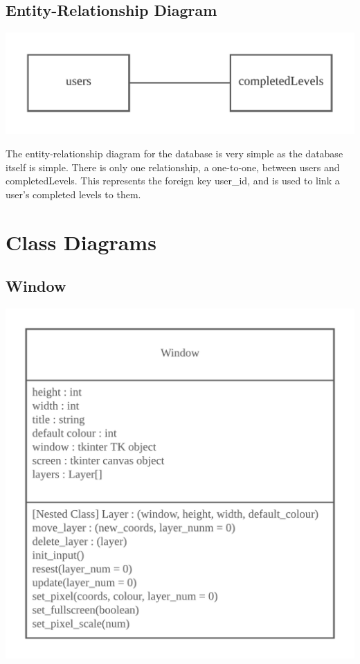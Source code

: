 \documentclass{article}
\begin{document}
\subsection{Entity-Relationship Diagram}
\begin{center}
\includegraphics[scale=1]{Database E-R Diagram}
\end{center}
The entity-relationship diagram for the database is very simple as the database itself is simple. There is only one relationship, a one-to-one, between users and completedLevels.
This represents the foreign key user\_id, and is used to link a user's completed levels to them.

\clearpage

\section{Class Diagrams}
\subsection{Window}
\begin{center}
	\includegraphics[scale=1]{Window Class}
\end{center}
\end{document}
